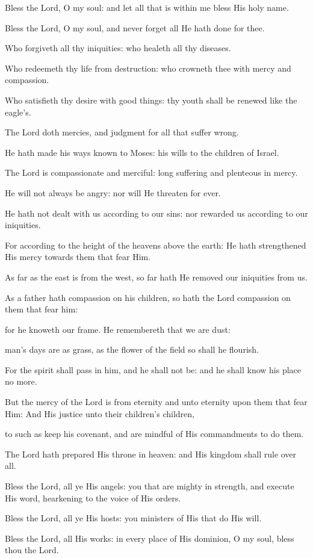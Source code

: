 

\begin{psalmmode}
Bless the Lord, O my soul: and let all
    that is within me bless His holy name.

   Bless the Lord, O my soul, and never forget all He hath
    done for thee.

   Who forgiveth all thy iniquities: who healeth all thy
    diseases.

   Who redeemeth thy life from destruction: who crowneth thee
    with mercy and compassion.

   Who satisfieth thy desire with good things: thy youth
    shall be renewed like the eagle's.

   The Lord doth mercies, and judgment for all that suffer
    wrong.

   He hath made his ways known to Moses: his wills to the
    children of Israel.

   The Lord is compassionate and merciful: long suffering and
    plenteous in mercy.

   He will not always be angry: nor will He threaten for
    ever.

  He hath not dealt with us according to our sins: nor
    rewarded us according to our iniquities.

  For according to the height of the heavens above the earth:
    He hath strengthened His mercy towards them that fear Him.

  As far as the east is from the west, so far hath He
    removed our iniquities from us.

  As a father hath compassion on his children, so hath the
    Lord compassion on them that fear him:

  for he knoweth our frame. He remembereth that we are dust:

  man's days are as grass, as the flower of the field so
    shall he flourish.

  For the spirit shall pass in him, and he shall not be: and
    he shall know his place no more.

  But the mercy of the Lord is from eternity and unto
    eternity upon them that fear Him: And His justice unto their
    children's children,

  to such as keep his covenant, and are mindful of His
    commandments to do them.

  The Lord hath prepared His throne in heaven: and His
    kingdom shall rule over all.

  Bless the Lord, all ye His angels: you that are mighty in
    strength, and execute His word, hearkening to the voice of
    His orders.

  Bless the Lord, all ye His hosts: you ministers of His
    that do His will.

  Bless the Lord, all His works: in every place of His
    dominion, O my soul, bless thou the Lord.

\end{psalmmode}

